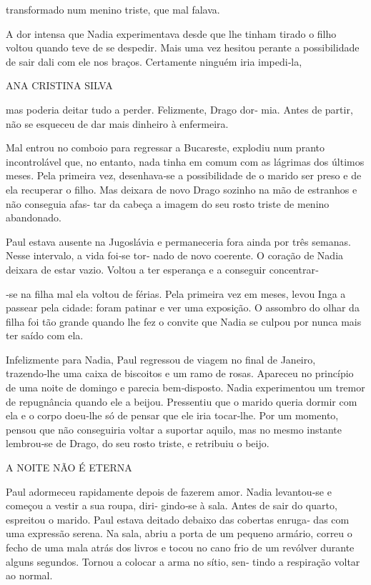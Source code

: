 transformado num menino triste, que mal falava.

A dor intensa que Nadia experimentava desde que lhe tinham tirado o
filho voltou quando teve de se despedir. Mais uma vez hesitou perante a
possibilidade de sair dali com ele nos braços. Certamente ninguém iria
impedi‑la,

ANA CRISTINA SILVA

mas poderia deitar tudo a perder. Felizmente, Drago dor‑ mia. Antes de
partir, não se esqueceu de dar mais dinheiro à enfermeira.

Mal entrou no comboio para regressar a Bucareste, explodiu num pranto
incontrolável que, no entanto, nada tinha em comum com as lágrimas dos
últimos meses. Pela primeira vez, desenhava‑se a possibilidade de o
marido ser preso e de ela recuperar o filho. Mas deixara de novo Drago
sozinho na mão de estranhos e não conseguia afas‑ tar da cabeça a imagem
do seu rosto triste de menino abandonado.

Paul estava ausente na Jugoslávia e permaneceria fora ainda por três
semanas. Nesse intervalo, a vida foi‑se tor‑ nado de novo coerente. O
coração de Nadia deixara de estar vazio. Voltou a ter esperança e a
conseguir concentrar‑

‑se na filha mal ela voltou de férias. Pela primeira vez em meses, levou
Inga a passear pela cidade: foram patinar e ver uma exposição. O
assombro do olhar da filha foi tão grande quando lhe fez o convite que
Nadia se culpou por nunca mais ter saído com ela.

Infelizmente para Nadia, Paul regressou de viagem no final de Janeiro,
trazendo‑lhe uma caixa de biscoitos e um ramo de rosas. Apareceu no
princípio de uma noite de domingo e parecia bem‑disposto. Nadia
experimentou um tremor de repugnância quando ele a beijou. Pressentiu
que o marido queria dormir com ela e o corpo doeu‑lhe só de pensar que
ele iria tocar‑lhe. Por um momento, pensou que não conseguiria voltar a
suportar aquilo, mas no mesmo instante lembrou‑se de Drago, do seu rosto
triste, e retribuiu o beijo.

A NOITE NÃO É ETERNA

Paul adormeceu rapidamente depois de fazerem amor. Nadia levantou‑se e
começou a vestir a sua roupa, diri‑ gindo‑se à sala. Antes de sair do
quarto, espreitou o marido. Paul estava deitado debaixo das cobertas
enruga‑ das com uma expressão serena. Na sala, abriu a porta de um
pequeno armário, correu o fecho de uma mala atrás dos livros e tocou no
cano frio de um revólver durante alguns segundos. Tornou a colocar a
arma no sítio, sen‑ tindo a respiração voltar ao normal.

